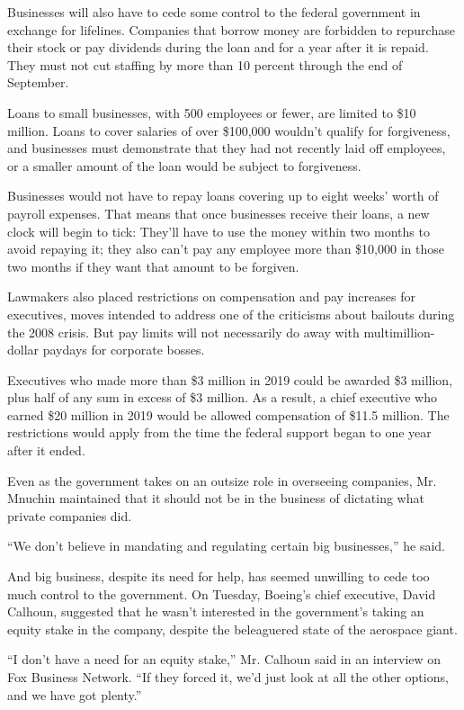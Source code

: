 Businesses will also have to cede some control to the federal government
in exchange for lifelines. Companies that borrow money are forbidden to
repurchase their stock or pay dividends during the loan and for a year
after it is repaid. They must not cut staffing by more than 10 percent
through the end of September.

Loans to small businesses, with 500 employees or fewer, are limited to
\$10 million. Loans to cover salaries of over \$100,000 wouldn't qualify
for forgiveness, and businesses must demonstrate that they had not
recently laid off employees, or a smaller amount of the loan would be
subject to forgiveness.

Businesses would not have to repay loans covering up to eight weeks'
worth of payroll expenses. That means that once businesses receive their
loans, a new clock will begin to tick: They'll have to use the money
within two months to avoid repaying it; they also can't pay any employee
more than \$10,000 in those two months if they want that amount to be
forgiven.

Lawmakers also placed restrictions on compensation and pay increases for
executives, moves intended to address one of the criticisms about
bailouts during the 2008 crisis. But pay limits will not necessarily do
away with multimillion-dollar paydays for corporate bosses.

Executives who made more than \$3 million in 2019 could be awarded \$3
million, plus half of any sum in excess of \$3 million. As a result, a
chief executive who earned \$20 million in 2019 would be allowed
compensation of \$11.5 million. The restrictions would apply from the
time the federal support began to one year after it ended.

Even as the government takes on an outsize role in overseeing companies,
Mr. Mnuchin maintained that it should not be in the business of
dictating what private companies did.

``We don't believe in mandating and regulating certain big businesses,''
he said.

And big business, despite its need for help, has seemed unwilling to
cede too much control to the government. On Tuesday, Boeing's chief
executive, David Calhoun, suggested that he wasn't interested in the
government's taking an equity stake in the company, despite the
beleaguered state of the aerospace giant.

``I don't have a need for an equity stake,'' Mr. Calhoun said in an
interview on Fox Business Network. ``If they forced it, we'd just look
at all the other options, and we have got plenty.''

